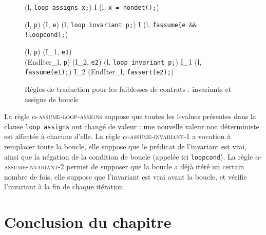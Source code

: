 \begin{figure}[bt]
  \scriptsize{
    {
      {}
      {(l, \mbox{\lstinline'loop assigns x;'})
        I \concat (l, \mbox{\lstinline'x = nondet();'})}{}
    }

    {
      {(l, \mbox{\lstinline'p'})  (I, \mbox{\lstinline'e'})}
      {
        (l, \mbox{\lstinline'loop invariant p;'}) 
        I \concat (l, \mbox{\lstinline'fassume(e && !loopcond);'})
      }{}
    }

    {
      {(l, \mbox{\lstinline'p'})  (I_1, \mbox{\lstinline'e1'}) \\
        (EndIter_l, \mbox{\lstinline'p'}) 
        (I_2, \mbox{\lstinline'e2'})}
      {
        (l, \mbox{\lstinline'loop invariant p;'}) 
        I_1 \concat (l, \mbox{\lstinline'fassume(e1);'})
        \concat I_2 \concat (EndIter_l, \mbox{\lstinline'fassert(e2);'})
      }{}
    }
  }
  \caption{Règles de traduction pour les faiblesses de contrats :
    invariants et assigns de boucle}
  \label{fig:assume-loop-annot}
\end{figure}

La règle \textsc{$\alpha$-assume-loop-assigns} suppose que toutes les l-values
présentes dans la clause \lstinline'loop assigns' ont changé de valeur : une
nouvelle valeur non déterministe est affectée à chacune d'elle.
La règle \textsc{$\alpha$-assume-invariant-1} a vocation à remplacer toute la
boucle, elle suppose que le prédicat de l'invariant est vrai, ainsi que la
négation de la condition de boucle (appelée ici \lstinline'loopcond').
La règle \textsc{$\alpha$-assume-invariant-2} permet de supposer que la boucle
a déjà itéré un certain nombre de fois, elle suppose que l'invariant est vrai
avant la boucle, et vérifie l'invariant à la fin de chaque itération.


\section*{Conclusion du chapitre}

